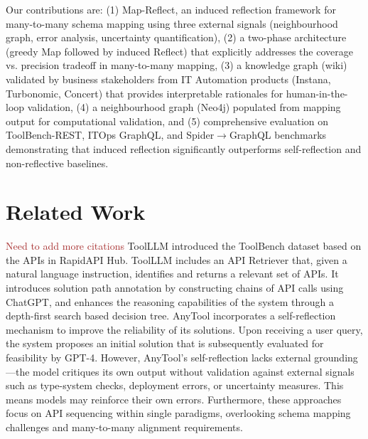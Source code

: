\documentclass[sigconf, nonacm]{acmart}
\newcommand{\bg}[1]{\textcolor{brown}{#1}}
\newcommand{\deleted}[1]{\textcolor{red}{#1}}
\begin{document}

Our contributions are: (1) Map-Reflect, an induced reflection framework for many-to-many schema mapping using three external signals (neighbourhood graph, error analysis, uncertainty quantification), (2) a two-phase architecture (greedy Map followed by induced Reflect) that explicitly addresses the coverage vs. precision tradeoff in many-to-many mapping, (3) a knowledge graph (wiki) validated by business stakeholders from IT Automation products (Instana, Turbonomic, Concert) that provides interpretable rationales for human-in-the-loop validation, (4) a neighbourhood graph (Neo4j) populated from mapping output for computational validation, and (5) comprehensive evaluation on ToolBench-REST, ITOps GraphQL, and Spider$\rightarrow$GraphQL benchmarks demonstrating that induced reflection significantly outperforms self-reflection and non-reflective baselines.


\section{Related Work}

\bg{Need to add more citations}
ToolLLM \cite{toolllm} introduced the ToolBench dataset based on the APIs in RapidAPI Hub. ToolLLM includes an API Retriever that, given a natural language instruction, identifies and returns a relevant set of APIs. It introduces solution path annotation by constructing chains of API calls using ChatGPT, and enhances the reasoning capabilities of the system through a depth-first search based decision tree. AnyTool \cite{anytool} incorporates a self-reflection mechanism to improve the reliability of its solutions. Upon receiving a user query, the system proposes an initial solution that is subsequently evaluated for feasibility by GPT-4. However, AnyTool's self-reflection lacks external grounding—the model critiques its own output without validation against external signals such as type-system checks, deployment errors, or uncertainty measures. This means models may reinforce their own errors. Furthermore, these approaches focus on API sequencing within single paradigms, overlooking schema mapping challenges and many-to-many alignment requirements.
\end{document}
